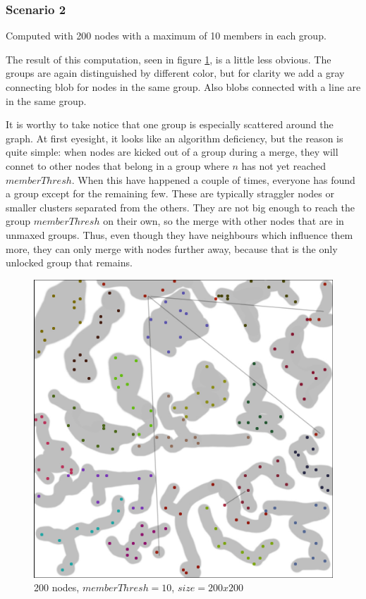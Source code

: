\documentclass[a4paper,UKenglish]{report}
\begin{document}
\subsubsection{Scenario 2} \label{scen2}
Computed with 200 nodes with a maximum of 10 members in each group.

The result of this computation, seen in figure \ref{fig:200_10}, is a little less obvious.
The groups are again distinguished by different color, but for clarity we add a gray connecting
blob for nodes in the same group. Also blobs connected with a line are in the same group. 

It is worthy to take notice that one group is especially scattered around the graph.
At first eyesight, it looks like an algorithm deficiency, but the reason is quite simple:
when nodes are kicked out of a group during a merge, they will connet to other nodes
that belong in a group where $n$ has not yet reached $memberThresh$. When this have happened a couple of times, everyone has found a group except for the remaining few.
These are typically straggler nodes or smaller clusters separated from the others.
They are not big enough to reach the group $memberThresh$ on their own, so the merge with other
nodes that are in unmaxed groups. Thus, even though they have neighbours which
influence them more, they can only merge with nodes further away,
because that is the only unlocked group that remains.
\begin{figure}
	\center
	\includegraphics[scale=0.45]{Images/grouptest_2.jpg}
	\caption{200 nodes, $memberThresh=10$, $size=200x200$}
	\label{fig:200_10}
\end{figure}
\end{document}
